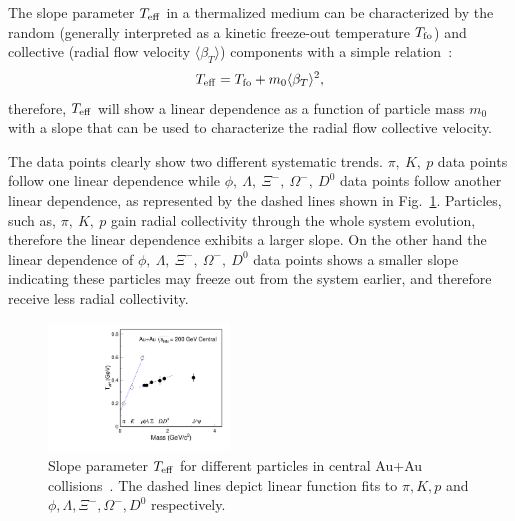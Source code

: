\documentclass[%
 reprint,	
 amsmath,amssymb,
 aps,
 prc,
]{revtex4-1}
\begin{document}
The slope parameter $T_{\rm eff}$ in a thermalized medium can be characterized by the random (generally interpreted as a kinetic freeze-out temperature $T_{\rm fo}$) and collective (radial flow velocity $\langle\beta_{T}\rangle$) components with a simple relation~\cite{StarWhitePaper,Csorgo:1995bi,Kolb:2003dz}:
\begin{equation}
  \begin{aligned}
T_{\rm eff} = T_{\rm fo} + m_0 \langle\beta_{T}\rangle^2,
  \end{aligned}
\label{equ:equation7}
\end{equation}
therefore, $T_{\rm eff}$ will show a linear dependence as a function of particle mass $m_0$ with a slope that can be used to characterize the radial flow collective velocity.

The data points clearly show two different systematic trends. $\pi,\ K,\ p$ data points follow one linear dependence while $\phi,\ \Lambda,\ \Xi^{-},\ \Omega^{-},\ D^0$ data points follow another linear dependence, as represented by the dashed lines shown in Fig.~\ref{fig:Teff_ALL}. Particles, such as, $\pi,\ K,\ p$ gain radial collectivity through the whole system evolution, therefore the linear dependence exhibits a larger slope. On the other hand the linear dependence of $\phi,\ \Lambda,\ \Xi^{-},\ \Omega^{-},\ D^0$ data points shows a smaller slope indicating these particles may freeze out from the system earlier, and therefore receive less radial collectivity.


\begin{figure}
\centering
\includegraphics[width=0.43\textwidth]{fig/Teff_ALL.pdf}
\caption{Slope parameter $T_{\rm eff}$ for different particles in central Au+Au collisions~\cite{Adams:2003xp,Abelev:2007rw,Adams:2006ke,Adamczyk:2013tvk}. The dashed lines depict linear function fits to $\pi,K,p$ and $\phi,\Lambda,\Xi^{-},\Omega^{-},D^0$ respectively.}
\label{fig:Teff_ALL} 
\end{figure}
\end{document}
